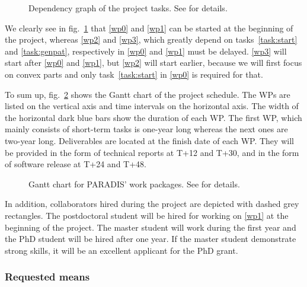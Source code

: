 \begin{figure}[htbp]
  \centering
  
  \caption{Dependency graph of the project tasks. See  for details.}
  \label{fig:tasks}
\end{figure}

We clearly see in fig.~\ref{fig:tasks} that \ref{wp0} and \ref{wp1} can be started
at the beginning of the project, whereas \ref{wp2} and \ref{wp3}, which greatly depend
on tasks~\ref{task:start} and \ref{task:genpat}, respectively in \ref{wp0} and \ref{wp1}
must be delayed. \ref{wp3} will start after \ref{wp0} and \ref{wp1}, but \ref{wp2} will
start earlier, because we will first focus on convex parts and only task~\ref{task:start}
in \ref{wp0} is required for that.

To sum up, fig.~\ref{fig:gantt} shows the Gantt chart of the project schedule.
The WPs are listed on the vertical axis and time intervals on the horizontal axis.
The width of the horizontal dark blue bars show the duration of each WP. The first WP,
which mainly consists of short-term tasks is one-year long whereas the next ones are
two-year long. Deliverables are located at the finish date of each WP. They will be
provided in the form of technical reports at T+12 and T+30, and in the form of software
release at T+24 and T+48.

\begin{figure}[htbp]
  \centering
  
  \caption{Gantt chart for PARADIS' work packages. See  for details.}
  \label{fig:gantt}
\end{figure}

In addition, collaborators hired during the project are depicted with dashed grey rectangles.
The postdoctoral student will be hired for working on \ref{wp1} at the beginning of the project.
The master student will work during the first year and the PhD student will be hired
after one year. If the master student demonstrate strong skills, it will be an excellent applicant
for the PhD grant.

\subsubsection{Requested means}
\label{sec:ressources}


